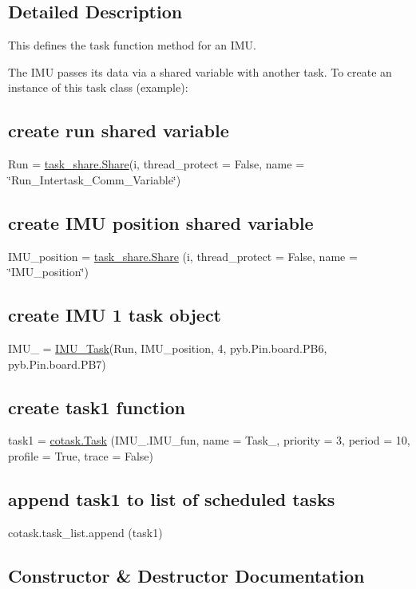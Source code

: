 \subsection{Detailed Description}
This defines the task function method for an I\+MU. 

The I\+MU passes its data via a shared variable with another task. To create an instance of this task class (example)\+: \subsection*{create run shared variable}

Run = \hyperlink{classtask__share_1_1Share}{task\+\_\+share.\+Share}(\textquotesingle{}i\textquotesingle{}, thread\+\_\+protect = False, name = \char`\"{}\+Run\+\_\+\+Intertask\+\_\+\+Comm\+\_\+\+Variable\char`\"{}) \subsection*{create I\+MU position shared variable}

I\+M\+U\+\_\+position = \hyperlink{classtask__share_1_1Share}{task\+\_\+share.\+Share} (\textquotesingle{}i\textquotesingle{}, thread\+\_\+protect = False, name = \char`\"{}\+I\+M\+U\+\_\+position\char`\"{}) \subsection*{create I\+MU 1 task object}

I\+M\+U\+\_ = \hyperlink{classIMU__task__func_1_1IMU__Task}{I\+M\+U\+\_\+\+Task}(Run, I\+M\+U\+\_\+position, 4, pyb.\+Pin.\+board.\+P\+B6, pyb.\+Pin.\+board.\+P\+B7) \subsection*{create task1 function}

task1 = \hyperlink{classcotask_1_1Task}{cotask.\+Task} (I\+M\+U\+\_.\+I\+M\+U\+\_\+fun, name = \textquotesingle{}Task\+\_\textquotesingle{}, priority = 3, period = 10, profile = True, trace = False) \subsection*{append task1 to list of scheduled tasks}

cotask.\+task\+\_\+list.\+append (task1) 

\subsection{Constructor \& Destructor Documentation}
